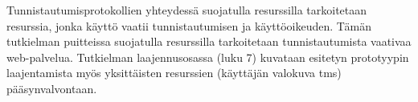 Tunnistautumisprotokollien yhteydessä suojatulla resurssilla tarkoitetaan resurssia, jonka käyttö vaatii tunnistautumisen ja käyttöoikeuden. Tämän tutkielman puitteissa suojatulla resurssilla tarkoitetaan tunnistautumista vaativaa web-palvelua. Tutkielman laajennusosassa (luku 7) kuvataan esitetyn prototyypin laajentamista myös yksittäisten resurssien (käyttäjän valokuva tms) pääsynvalvontaan.